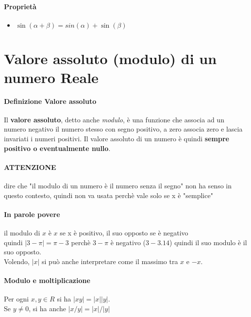 \documentclass[12pt, a4paper, openany]{book}
\begin{document}
\paragraph*{Proprietà}
\begin{itemize}
	\item $\sin(\alpha + \beta) = sin(\alpha) + \sin(\beta)$
\end{itemize}
\section{Valore assoluto (modulo) di un numero Reale}
\paragraph*{Definizione Valore assoluto} Il \textbf{valore assoluto}, detto anche \emph{modulo}, è una funzione che
associa ad un numero negativo il numero stesso con segno positivo, a zero associa zero e lascia invariati i 
numeri positivi. 
Il valore assoluto di un numero è quindi \textbf{sempre positivo o eventualmente nullo}. 
\paragraph{ATTENZIONE} dire che "il modulo di un numero è il numero senza il segno" non ha senso in questo contesto, quindi non va usata perchè vale solo se x è "semplice"
\paragraph{In parole povere} il modulo di $x$ è $x$ se x è positivo, il suo opposto se è negativo\\
quindi $|3 - \pi| = \pi - 3$ perchè $3-\pi$ è negativo ($3 - 3.14$) quindi il suo modulo è il suo opposto.
\\Volendo, $|x|$ si può anche interpretare come il massimo tra $x$ e $-x$.

\paragraph{Modulo e moltiplicazione}
Per ogni $x, y \in R$ si ha $|xy| = |x||y|$.\\Se $y\neq0$, si ha anche $|x/y|=|x|/|y|$
\end{document}
